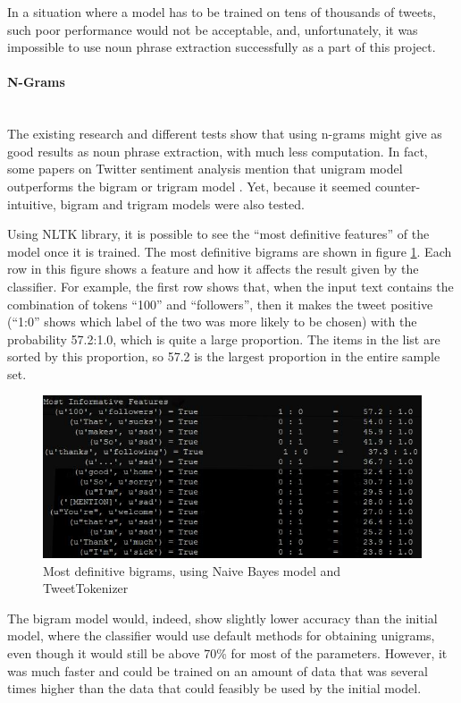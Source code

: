 In a situation where a model has to be trained on tens of thousands of tweets, such poor performance would not be acceptable, and, unfortunately, it was impossible to use noun phrase extraction successfully as a part of this project. 

\paragraph{N-Grams}\mbox{}\\
The existing research and different tests show that using n-grams might give as good results as noun phrase extraction, with much less computation. In fact, some papers on Twitter sentiment analysis mention that unigram model outperforms the bigram or trigram model \cite{agarwal2011sentiment}. Yet, because it seemed counter-intuitive, bigram and trigram models were also tested.

Using NLTK library, it is possible to see the ``most definitive features'' of the model once it is trained. The most definitive bigrams are shown in figure \ref{fig:bigrams}. Each row in this figure shows a feature and how it affects the result given by the classifier. For example, the first row shows that, when the input text contains the combination of tokens ``100'' and  ``followers'', then it makes the tweet positive (``1:0'' shows which label of the two was more likely to be chosen) with the probability 57.2:1.0, which is quite a large proportion. The items in the list are sorted by this proportion, so 57.2 is the largest proportion in the entire sample set.

\begin{figure}
    \centering
    \includegraphics[width=\textwidth]{most_definitive_bigrams}
    \caption{Most definitive bigrams, using Naive Bayes model and TweetTokenizer}
    \label{fig:bigrams}
\end{figure}

The bigram model would, indeed, show slightly lower accuracy than the initial model, where the classifier would use default methods for obtaining unigrams, even though it would still be above 70\% for most of the parameters. However, it was much faster and could be trained on an amount of data that was several times higher than the data that could feasibly be used by the initial model. 

